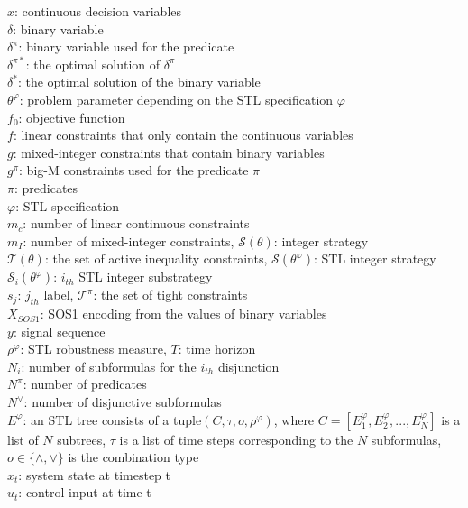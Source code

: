 \documentclass[a4paper]{report}
\begin{document}
$x$: continuous decision variables\\
$\delta$: binary variable\\  $\delta^\pi$: binary variable used for the predicate\\ 
$\delta^{\pi*}$: the optimal solution of $\delta^\pi$ \\ 
$\delta^*$: the optimal solution of the binary variable\\
$\theta^\varphi$: problem parameter depending on the STL specification $\varphi$\\
$f_0$: objective function\\
$f$: linear constraints that only contain the continuous variables\\
$g$: mixed-integer constraints that contain binary variables\\
$g^\pi$: big-M constraints used for the predicate $\pi$\\
$\pi$: predicates\\
$\varphi$: STL specification\\
$m_c$: number of linear continuous constraints \\
$m_I$: number of mixed-integer constraints,
$\mathcal{S}(\theta)$: integer strategy\\
$\mathcal{T}(\theta)$: the set of active inequality constraints,
$\mathcal{S}(\theta^\varphi)$: STL integer strategy \\
$\mathcal{S}_i(\theta^\varphi)$: $i_{th}$ STL integer substrategy \\
$s_j$: $j_{th}$ label,
$\mathcal{T}^\pi$: the set of tight constraints\\
$X_{SOS1}$: SOS1 encoding from the values of binary variables\\
$y$: signal sequence\\
$\rho^\varphi$: STL robustness measure,
$T$: time horizon\\
$N_i$: number of subformulas for the $i_{th}$ disjunction \\
$N^\pi$: number of predicates\\
$N^\vee$: number of disjunctive subformulas\\
$E^\varphi$: an STL tree consists of a tuple$(C, \tau, o, \rho^\varphi)$, where  $C = [E^\varphi_1,E^\varphi_2,...,E^\varphi_N]  $ is a list of $N$ subtrees, $\tau $ is a list of time steps corresponding to the $N$ subformulas, $o \in \{ \wedge, \vee\}$ is the combination type\\
$x_t$: system state at timestep t\\ 
$u_t$: control input at time t\\
\end{document}
